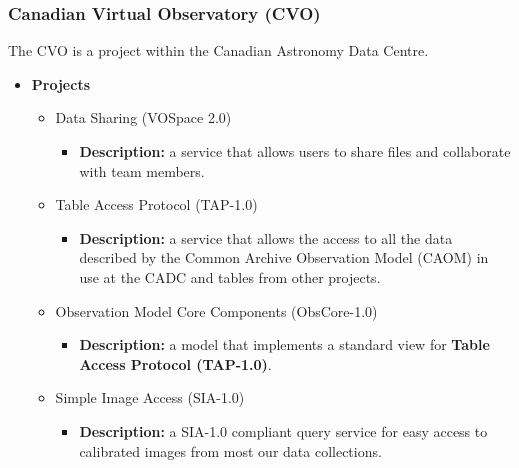 \subsubsection{Canadian Virtual Observatory (CVO)}
The CVO \cite{website:cvo-home} \nocite{SchadeDowlerDurand2004} is a project
within the Canadian Astronomy Data Centre.

\begin{itemize}
\item \textbf{Projects}
\begin{itemize}
\item Data Sharing (VOSpace 2.0)
\begin{itemize}
\item \textbf{Description:} a service that allows users to share files and
collaborate with team members.
\end{itemize}
\item Table Access Protocol (TAP-1.0)
\begin{itemize}
\item \textbf{Description:} a service that allows the access to all the data
described by the Common Archive Observation Model (CAOM) in use at the CADC and
tables from other projects.
\end{itemize}
\item Observation Model Core Components (ObsCore-1.0)
\begin{itemize}
\item \textbf{Description:} a model that implements a standard view for
\textbf{Table Access Protocol (TAP-1.0)}.
\end{itemize}
\item Simple Image Access (SIA-1.0)
\begin{itemize}
\item \textbf{Description:} a SIA-1.0 compliant query service for easy access to
calibrated images from most our data collections.
\end{itemize}
\end{itemize}
\end{itemize}

